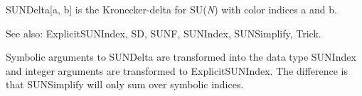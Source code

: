


SUNDelta[a, b] is the Kronecker-delta for SU({\itshape N}) with color indices a and b.

See also: ExplicitSUNIndex, SD, SUNF, SUNIndex, SUNSimplify, Trick.
















Symbolic arguments to SUNDelta are transformed into the data type SUNIndex and integer arguments are transformed to ExplicitSUNIndex. The
  difference is that SUNSimplify will only sum over symbolic indices.



